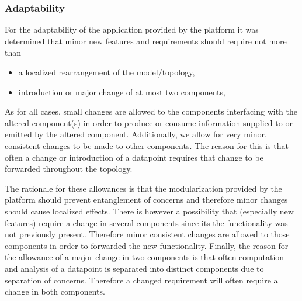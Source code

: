 \subsubsection{Adaptability}
For the adaptability of the application provided by the platform it was determined that minor new features and requirements should require not more than
\begin{itemize}
\nospace
\item a localized rearrangement of the model/topology, 
\item introduction or major change of at most two components, 
\end{itemize}
As for all cases, small changes are allowed to the components interfacing with the altered component(s) in order to produce or consume information supplied to or emitted by the altered component. Additionally, we allow for very minor, consistent changes to be made to other components. The reason for this is that often a change or introduction of a datapoint requires that change to be forwarded throughout the topology.

The rationale for these allowances is that the modularization provided by the platform should prevent entanglement of concerns and therefore minor changes should cause localized effects. There is however a possibility that (especially new features) require a change in several components since its the functionality was not previously present. Therefore minor consistent changes are allowed to those components in order to forwarded the new functionality. Finally, the reason for the allowance of a major change in two components is that often computation and analysis of a datapoint is separated into distinct components due to separation of concerns. Therefore a changed requirement will often require a change in both components.


